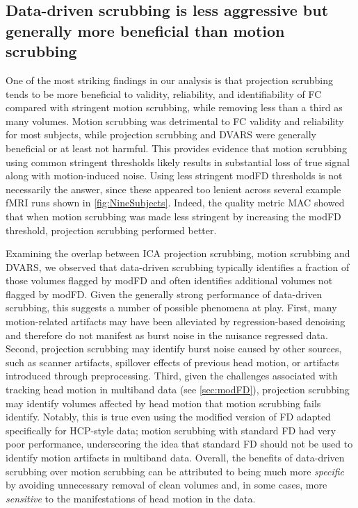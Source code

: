 \documentclass{article}
\begin{document}
\subsection{Data-driven scrubbing is less aggressive but generally more beneficial than motion scrubbing}

One of the most striking findings in our analysis is that projection scrubbing tends to be more beneficial to validity, reliability, and identifiability of FC compared with stringent motion scrubbing, while removing less than a third as many volumes. Motion scrubbing was detrimental to FC validity and reliability for most subjects, while projection scrubbing and DVARS were generally beneficial or at least not harmful. This provides evidence that motion scrubbing using common stringent thresholds likely results in substantial loss of true signal along with motion-induced noise. Using less stringent modFD thresholds is not necessarily the answer, since these appeared too lenient across several example fMRI runs shown in \autoref{fig:NineSubjects}. Indeed, the quality metric MAC showed that when motion scrubbing was made less stringent by increasing the modFD threshold, projection scrubbing performed better.

Examining the overlap between ICA projection scrubbing, motion scrubbing and DVARS, we observed that data-driven scrubbing typically identifies a fraction of those volumes flagged by modFD and often identifies additional volumes not flagged by modFD. Given the generally strong performance of data-driven scrubbing, this suggests a number of possible phenomena at play. First, many motion-related artifacts may have been alleviated by regression-based denoising and therefore do not manifest as burst noise in the nuisance regressed data. Second, projection scrubbing may identify burst noise caused by other sources, such as scanner artifacts, spillover effects of previous head motion, or artifacts introduced through preprocessing. Third, given the challenges associated with tracking head motion in multiband data (see \autoref{sec:modFD}), projection scrubbing may identify volumes affected by head motion that motion scrubbing fails identify. Notably, this is true even using the modified version of FD adapted specifically for HCP-style data; motion scrubbing with standard FD had very poor performance, underscoring the idea that standard FD should not be used to identify motion artifacts in multiband data. Overall, the benefits of data-driven scrubbing over motion scrubbing can be attributed to being much more \textit{specific} by avoiding unnecessary removal of clean volumes and, in some cases, more \textit{sensitive} to the manifestations of head motion in the data.
\end{document}
